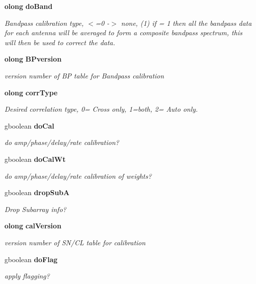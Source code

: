\begin{CompactItemize}
{\bf olong} {\bf do\-Band}
\begin{CompactList}\small\item\em Bandpass calibration type, $<$=0 -$>$ none, (1) if = 1 then all the bandpass data for each antenna will be averaged to form a composite bandpass spectrum, this will then be used to correct the data. \item\end{CompactList}\item 
{\bf olong} {\bf BPversion}
\begin{CompactList}\small\item\em version number of BP table for Bandpass calibration \item\end{CompactList}\item 
{\bf olong} {\bf corr\-Type}
\begin{CompactList}\small\item\em Desired correlation type, 0= Cross only, 1=both, 2= Auto only. \item\end{CompactList}\item 
gboolean {\bf do\-Cal}
\begin{CompactList}\small\item\em do amp/phase/delay/rate calibration? \item\end{CompactList}\item 
gboolean {\bf do\-Cal\-Wt}
\begin{CompactList}\small\item\em do amp/phase/delay/rate calibration of weights? \item\end{CompactList}\item 
gboolean {\bf drop\-Sub\-A}
\begin{CompactList}\small\item\em Drop Subarray info? \item\end{CompactList}\item 
{\bf olong} {\bf cal\-Version}
\begin{CompactList}\small\item\em version number of SN/CL table for calibration \item\end{CompactList}\item 
gboolean {\bf do\-Flag}
\begin{CompactList}\small\item\em apply flagging? \item\end{CompactList}\item 

\end{CompactItemize}
